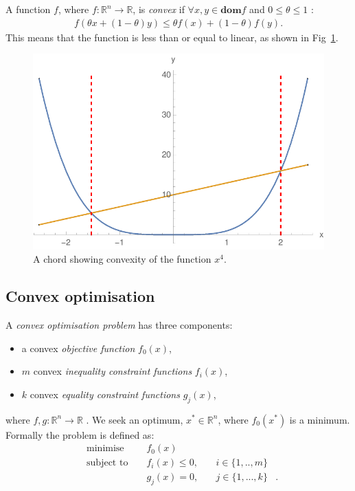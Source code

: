 \documentclass[twocolumn,secnumarabic,amssymb, nobibnotes, aps, prl,superscriptaddress]{revtex4-1}
\begin{document}
A function $f$, where $f:\mathbb{R}^n \rightarrow \mathbb{R}$, is \textit{convex} if $\forall x,y\in \textbf{dom} f$ and $0 \leq \theta \leq 1$ \cite[p.67]{cvxpybook}:
\begin{align}
f(\theta x + (1-\theta)y) \leq \theta f(x)+(1-\theta)f(y).
\end{align}
This means that the function is less than or equal to linear, as shown in Fig~\ref{fig:convex}. %
\begin{figure}
\includegraphics[width=0.9\linewidth]{convex_function.pdf}
\caption{\label{fig:convex}A chord showing convexity of the function $x^4$.} 
\end{figure}

\subsection{Convex optimisation}
A \textit{convex optimisation problem} has three components:
\begin{itemize}
\item a convex \textit{objective function} $f_0(x)$,
\item $m$ convex \textit{inequality constraint functions} $f_i(x)$,
\item $k$ convex \textit{equality constraint functions} $g_j(x)$, 
\end{itemize}
where $f,g: \mathbb{R}^n \rightarrow \mathbb{R}$ \cite[p.141]{cvxpybook}. We seek an optimum, $x^*\in \mathbb{R}^n$, where $f_0(x^*)$ is a minimum. Formally the problem is defined as:
\begin{align} \label{eq:cvxdefn}
&\text{minimise } && f_0(x) & \nonumber &\\
&\text{subject to } && f_i(x) \leq 0,\quad & i\in \{1,..,m\}\nonumber &\\
& && g_{j}(x)=0,\quad & j\in \{1,...,k\} &.
\end{align}
\end{document}
